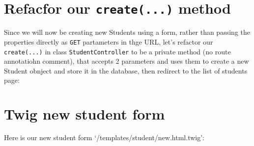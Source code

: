 \documentclass[a4paperpaper,openright]{book}
\newenvironment{Shaded}{}{}
\newcommand{\FunctionTok}[1]{\textcolor[rgb]{0.02,0.16,0.49}{#1}}
\newcommand{\KeywordTok}[1]{\textcolor[rgb]{0.00,0.44,0.13}{\textbf{#1}}}
\newcommand{\NormalTok}[1]{#1}
\newcommand{\OtherTok}[1]{\textcolor[rgb]{0.00,0.44,0.13}{#1}}
\newcommand{\StringTok}[1]{\textcolor[rgb]{0.25,0.44,0.63}{#1}}
\begin{document}
\hypertarget{refacfor-our-create...-method}{%
\section{\texorpdfstring{Refacfor our \texttt{create(...)}
method}{Refacfor our create(...) method}}\label{refacfor-our-create...-method}}

Since we will now be creating new Students using a form, rather than
passing the properties directly as \texttt{GET} partameters in thge URL,
let's refactor our \texttt{create(...)} in class
\texttt{StudentController} to be a private method (no route annotatiohn
comment), that accepts 2 parameters and uses them to create a new
Student obnject and store it in the database, then redirect to the list
of students page:

\begin{Shaded}
\end{Shaded}

\hypertarget{twig-new-student-form}{%
\section{Twig new student form}\label{twig-new-student-form}}

Here is our new student form `/templates/student/new.html.twig':
\end{document}
